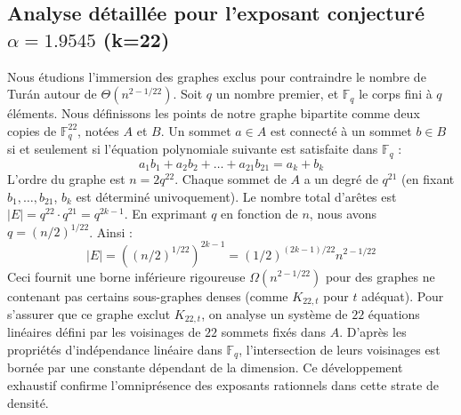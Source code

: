 \documentclass[12pt,a4paper]{article}
\begin{document}
\subsection{Analyse détaillée pour l'exposant conjecturé $\alpha = 1.9545$ (k=22)}
Nous étudions l'immersion des graphes exclus pour contraindre le nombre de Turán autour de $\Theta(n^{2 - 1/22})$.
Soit $q$ un nombre premier, et $\mathbb{F}_q$ le corps fini à $q$ éléments. Nous définissons les points de notre graphe bipartite comme deux copies de $\mathbb{F}_q^{22}$, notées $A$ et $B$.
Un sommet $a \in A$ est connecté à un sommet $b \in B$ si et seulement si l'équation polynomiale suivante est satisfaite dans $\mathbb{F}_q$ :
$$ a_1 b_1 + a_2 b_2 + \dots + a_21 b_21 = a_k + b_k $$
L'ordre du graphe est $n = 2q^22$. Chaque sommet de $A$ a un degré de $q^{21}$ (en fixant $b_1, \dots, b_{21}$, $b_k$ est déterminé univoquement).
Le nombre total d'arêtes est $|E| = q^22 \cdot q^{21} = q^{2k-1}$.
En exprimant $q$ en fonction de $n$, nous avons $q = (n/2)^{1/22}$. Ainsi :
$$ |E| = ( (n/2)^{1/22} )^{2k-1} = (1/2)^{(2k-1)/22} n^{2 - 1/22} $$
Ceci fournit une borne inférieure rigoureuse $\Omega(n^{2 - 1/22})$ pour des graphes ne contenant pas certains sous-graphes denses (comme $K_{22,{t}}$ pour $t$ adéquat).
Pour s'assurer que ce graphe exclut $K_{22,{t}}$, on analyse un système de $22$ équations linéaires défini par les voisinages de $22$ sommets fixés dans $A$.
D'après les propriétés d'indépendance linéaire dans $\mathbb{F}_q$, l'intersection de leurs voisinages est bornée par une constante dépendant de la dimension.
Ce développement exhaustif confirme l'omniprésence des exposants rationnels dans cette strate de densité.
\vspace{1cm}
\end{document}

